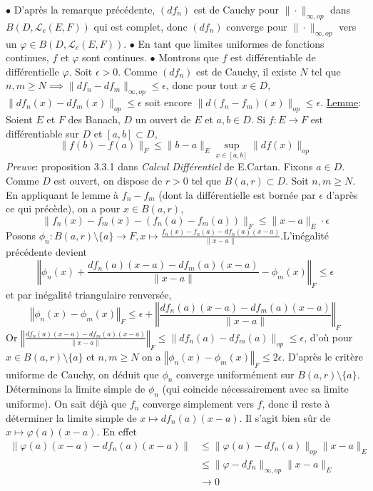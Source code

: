 \documentclass{report}
\begin{document}
$\bullet$ D'après la remarque précédente, $(df_n)$ est de Cauchy pour $\|\cdot\|_{\infty, op}$ dans $B(D,\mathcal L_c(E,F))$ qui est complet, donc $(df_n)$ converge pour $\|\cdot\|_{\infty, op}$ vers un $\varphi\in B(D,\mathcal L_c(E,F))$.\newline
$\bullet$ En tant que limites uniformes de fonctions continues, $f$ et $\varphi$ sont continues.\newline
$\bullet$ Montrons que $f$ est différentiable de différentielle $\varphi$.\newline
Soit $\epsilon >0$. Comme $(df_n)$ est de Cauchy, il existe $N$ tel que $n,m\geq N \implies \|df_n - df_m\|_{\infty, op}\leq \epsilon$, donc pour tout $x\in D$, $\|df_n(x) - df_m(x)\|_{op}\leq \epsilon$ soit encore $\|d(f_n-f_m)(x)\|_{op}\leq \epsilon$.\newline
\underline{Lemme}: Soient $E$ et $F$ des Banach, $D$ un ouvert de $E$ et $a,b\in D$. Si $f:E\to F$ est différentiable sur $D$ et $[a,b]\subset D$, $$\|f(b)-f(a)\|_F\leq \|b-a\|_E \sup_{x\in [a,b]}\|df(x)\|_{op}$$
\textit{Preuve}: proposition 3.3.1 dans \textit{Calcul Différentiel} de E.Cartan.\newline \newline 
Fixons $a\in D$. Comme $D$ est ouvert, on dispose de $r>0$ tel que $B(a,r)\subset D$. Soit $n,m\geq N$. En appliquant le lemme à $f_n-f_m$ (dont la différentielle est bornée par $\epsilon$ d'après ce qui précède), on a pour $x\in B(a,r)$, $$\|f_n(x)-f_m(x)-(f_n(a)-f_m(a))\|_F\leq \|x-a\|_E \cdot\epsilon$$
Posons $\displaystyle \phi_n: B(a,r)\setminus \{a\}\to F, x\mapsto \frac{f_n(x)-f_n(a)-df_n(a)(x-a)}{\|x-a\|}$.\newline  L'inégalité précédente devient $$\left \Vert \phi_n(x) + \frac{df_n(a)(x-a)-df_m(a)(x-a)}{\|x-a\|} - \phi_m(x)\right \Vert_F\leq \epsilon $$ et par inégalité triangulaire renversée, $$\left \Vert \phi_n(x) - \phi_m(x)\right \Vert_F\leq \epsilon + \left \Vert \frac{df_n(a)(x-a)-df_m(a)(x-a)}{\|x-a\|}\right \Vert_F $$
Or $\displaystyle \left \Vert \frac{df_n(a)(x-a)-df_m(a)(x-a)}{\|x-a\|}\right \Vert_F \leq  \|df_n(a)-df_m(a)\|_{op}\leq \epsilon $,\newline
 d'où pour $x\in B(a,r)\setminus \{a\}$ et $n,m\geq N$ on a $\displaystyle \left \Vert \phi_n(x) - \phi_m(x)\right \Vert_F\leq 2\epsilon$.
D'après le critère uniforme de Cauchy, on déduit que $\phi_n$ converge uniformément sur $B(a,r)\setminus \{a\}$.\newline
Déterminons la limite simple de $\phi_n$ (qui coincide nécessairement avec sa limite uniforme). On sait déjà que $f_n$ converge simplement vers $f$, donc il reste à déterminer la limite simple de $x\mapsto df_n(a)(x-a)$. Il s'agit bien sûr de $x\mapsto \varphi(a)(x-a)$. En effet $$\begin{aligned}\|\varphi(a)(x-a)-df_n(a)(x-a)\| &\leq \|\varphi(a)-df_n(a)\|_{op}\|x-a\|_E\\ &\leq \|\varphi -df_n\|_{\infty, op}\|x-a\|_E\\ &\to 0 \end{aligned}$$
\end{document}
